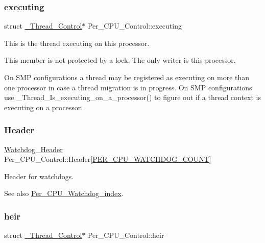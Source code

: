 \subsubsection{\texorpdfstring{executing}{executing}}
{\footnotesize\ttfamily struct \mbox{\hyperlink{struct__Thread__Control}{\+\_\+\+Thread\+\_\+\+Control}}$\ast$ Per\+\_\+\+C\+P\+U\+\_\+\+Control\+::executing}



This is the thread executing on this processor. 

This member is not protected by a lock. The only writer is this processor.

On S\+MP configurations a thread may be registered as executing on more than one processor in case a thread migration is in progress. On S\+MP configurations use \+\_\+\+Thread\+\_\+\+Is\+\_\+executing\+\_\+on\+\_\+a\+\_\+processor() to figure out if a thread context is executing on a processor. \mbox{\label{structPer__CPU__Control_a2d2163a1bbf81d706b0018f438a9c61f}} 
\subsubsection{\texorpdfstring{Header}{Header}}
{\footnotesize\ttfamily \mbox{\hyperlink{structWatchdog__Header}{Watchdog\+\_\+\+Header}} Per\+\_\+\+C\+P\+U\+\_\+\+Control\+::\+Header\mbox{[}\mbox{\hyperlink{group__PerCPU_gga43ab5440a69211901b58fa787f9cd76ea49ebdf20f41288627c23ddc6e63a20ab}{P\+E\+R\+\_\+\+C\+P\+U\+\_\+\+W\+A\+T\+C\+H\+D\+O\+G\+\_\+\+C\+O\+U\+NT}}\mbox{]}}



Header for watchdogs. 

\begin{DoxySeeAlso}{See also}
\mbox{\hyperlink{group__PerCPU_ga43ab5440a69211901b58fa787f9cd76e}{Per\+\_\+\+C\+P\+U\+\_\+\+Watchdog\+\_\+index}}. 
\end{DoxySeeAlso}
\mbox{\label{structPer__CPU__Control_a04b6cae98eb4a23510c81d90caf0a196}} 
\subsubsection{\texorpdfstring{heir}{heir}}
{\footnotesize\ttfamily struct \mbox{\hyperlink{struct__Thread__Control}{\+\_\+\+Thread\+\_\+\+Control}}$\ast$ Per\+\_\+\+C\+P\+U\+\_\+\+Control\+::heir}



